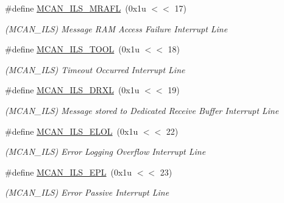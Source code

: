 \begin{DoxyCompactItemize}
\mbox{\label{group__SAME70__MCAN_gaecb4cdda7323e542873162438dc38e7e}} 
\#define \mbox{\hyperlink{group__SAME70__MCAN_gaecb4cdda7323e542873162438dc38e7e}{M\+C\+A\+N\+\_\+\+I\+L\+S\+\_\+\+M\+R\+A\+FL}}~(0x1u $<$$<$ 17)
\begin{DoxyCompactList}\small\item\em (M\+C\+A\+N\+\_\+\+I\+LS) Message R\+AM Access Failure Interrupt Line \end{DoxyCompactList}\item 
\mbox{\label{group__SAME70__MCAN_ga50afdf2a87b4027bacb8934e3f3a87e9}} 
\#define \mbox{\hyperlink{group__SAME70__MCAN_ga50afdf2a87b4027bacb8934e3f3a87e9}{M\+C\+A\+N\+\_\+\+I\+L\+S\+\_\+\+T\+O\+OL}}~(0x1u $<$$<$ 18)
\begin{DoxyCompactList}\small\item\em (M\+C\+A\+N\+\_\+\+I\+LS) Timeout Occurred Interrupt Line \end{DoxyCompactList}\item 
\mbox{\label{group__SAME70__MCAN_ga9f9b83f851b085275f5e017b41dd608e}} 
\#define \mbox{\hyperlink{group__SAME70__MCAN_ga9f9b83f851b085275f5e017b41dd608e}{M\+C\+A\+N\+\_\+\+I\+L\+S\+\_\+\+D\+R\+XL}}~(0x1u $<$$<$ 19)
\begin{DoxyCompactList}\small\item\em (M\+C\+A\+N\+\_\+\+I\+LS) Message stored to Dedicated Receive Buffer Interrupt Line \end{DoxyCompactList}\item 
\mbox{\label{group__SAME70__MCAN_ga32ffb3abe45fb96c5f8c9a0c16c81655}} 
\#define \mbox{\hyperlink{group__SAME70__MCAN_ga32ffb3abe45fb96c5f8c9a0c16c81655}{M\+C\+A\+N\+\_\+\+I\+L\+S\+\_\+\+E\+L\+OL}}~(0x1u $<$$<$ 22)
\begin{DoxyCompactList}\small\item\em (M\+C\+A\+N\+\_\+\+I\+LS) Error Logging Overflow Interrupt Line \end{DoxyCompactList}\item 
\mbox{\label{group__SAME70__MCAN_ga0be2dc33b6f95a9b9b7bef79dc2674d3}} 
\#define \mbox{\hyperlink{group__SAME70__MCAN_ga0be2dc33b6f95a9b9b7bef79dc2674d3}{M\+C\+A\+N\+\_\+\+I\+L\+S\+\_\+\+E\+PL}}~(0x1u $<$$<$ 23)
\begin{DoxyCompactList}\small\item\em (M\+C\+A\+N\+\_\+\+I\+LS) Error Passive Interrupt Line \end{DoxyCompactList}\item 
$$
\end{DoxyCompactItemize}
